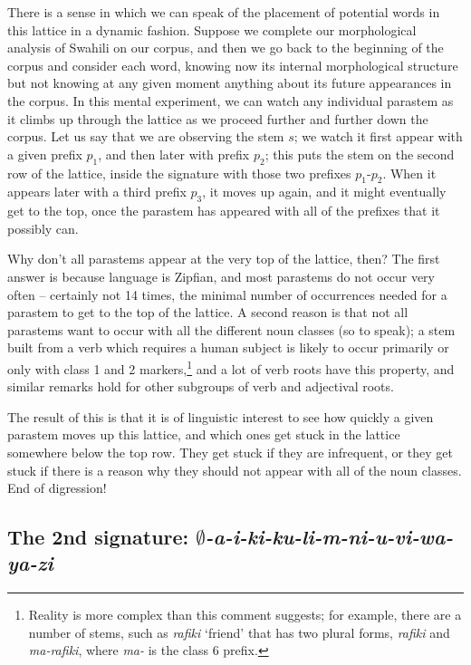 \documentclass[output=paper,colorlinks,citecolor=brown,
]{langscibook}
\begin{document}
There is a sense in which we can speak of the placement of potential words in this lattice in a dynamic fashion. Suppose we complete our morphological analysis of Swahili on our corpus, and then we go back to the beginning of the corpus and consider each word, knowing now its internal morphological structure but not knowing at any given moment anything about its future appearances in the corpus. In this mental experiment, we can watch any individual parastem as it climbs up through the lattice as we proceed further and further down the corpus. Let us say that we are observing the stem $s$; we watch it first appear with a given prefix $p_1$, and then later with prefix $p_2$; this puts the stem on the second row of the lattice, inside the signature with those two prefixes $p_1$-$p_2$. When it appears later with a third prefix $p_3$, it moves up again, and it might eventually get to the top, once the parastem has appeared with all of the prefixes that it possibly can. 

Why don't all parastems appear at the very top of the lattice, then? The first answer is because language is Zipfian, and most parastems do not occur very often -- certainly not 14 times, the minimal number of occurrences needed for a parastem to get to the top of the lattice. A second reason is that not all parastems want to occur with all the different noun classes (so to speak); a stem built from a verb which requires a human subject is likely to occur primarily or only with class 1 and 2 markers,\footnote{Reality is more complex than this comment suggests; for example, there are a number of stems, such as \textit{rafiki} `friend' that has two plural forms, \textit{rafiki} and \textit{ma-rafiki}, where \textit{ma-} is the class 6 prefix.} and a lot of verb roots have this property, and similar remarks hold for other subgroups of verb and adjectival roots. 

The result of this is that it is of linguistic interest to see how quickly a given parastem moves up this lattice, and which ones get stuck in the lattice somewhere below the top row. They get stuck if they are infrequent, or they get stuck if there is a reason why they should not appear with all of the noun classes. End of digression!

\subsection{The 2nd signature: \textit{$\emptyset$-a-i-ki-ku-li-m-ni-u-vi-wa-ya-zi} }
 
\end{document}
